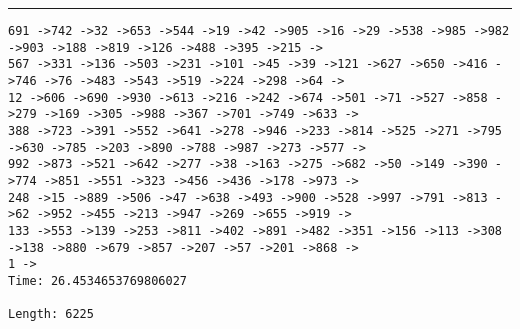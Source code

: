 \documentclass[letter, 12pt]{article}
\newenvironment{question}[1]{%
    \vspace{.2in}%
        \noindent{\bf #1}%
    \vspace{0.3em} \hrule \vspace{.1in}%
}{}
\begin{document}
\begin{question}{\large Appendix}
\begin{lstlisting}[style=CStyle]
691 ->742 ->32 ->653 ->544 ->19 ->42 ->905 ->16 ->29 ->538 ->985 ->982 ->903 ->188 ->819 ->126 ->488 ->395 ->215 ->
567 ->331 ->136 ->503 ->231 ->101 ->45 ->39 ->121 ->627 ->650 ->416 ->746 ->76 ->483 ->543 ->519 ->224 ->298 ->64 ->
12 ->606 ->690 ->930 ->613 ->216 ->242 ->674 ->501 ->71 ->527 ->858 ->279 ->169 ->305 ->988 ->367 ->701 ->749 ->633 ->
388 ->723 ->391 ->552 ->641 ->278 ->946 ->233 ->814 ->525 ->271 ->795 ->630 ->785 ->203 ->890 ->788 ->987 ->273 ->577 ->
992 ->873 ->521 ->642 ->277 ->38 ->163 ->275 ->682 ->50 ->149 ->390 ->774 ->851 ->551 ->323 ->456 ->436 ->178 ->973 ->
248 ->15 ->889 ->506 ->47 ->638 ->493 ->900 ->528 ->997 ->791 ->813 ->62 ->952 ->455 ->213 ->947 ->269 ->655 ->919 ->
133 ->553 ->139 ->253 ->811 ->402 ->891 ->482 ->351 ->156 ->113 ->308 ->138 ->880 ->679 ->857 ->207 ->57 ->201 ->868 ->
1 ->
Time: 26.4534653769806027

Length: 6225


\end{lstlisting}
\end{question}
\end{document}
